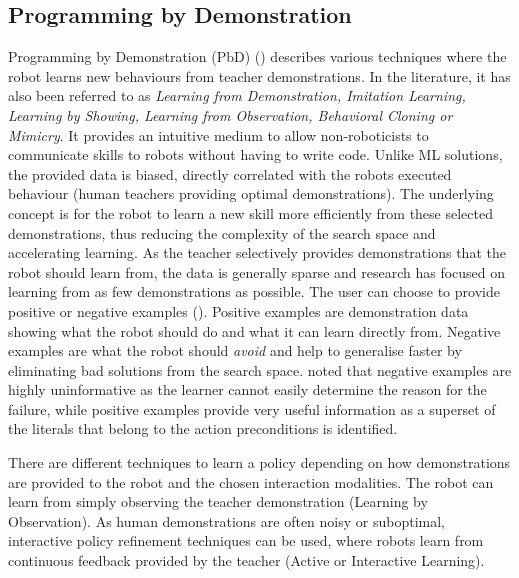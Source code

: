 \subsection{Programming by Demonstration}\label{sssec:PbD}
Programming by Demonstration (PbD) (\cite{billard2016learning,argall2009survey}) describes various techniques where the robot learns new behaviours from teacher demonstrations.
In the literature, it has also been referred to as \textit{Learning from Demonstration, Imitation Learning, Learning by Showing, Learning from Observation, Behavioral Cloning or Mimicry}.
It provides an intuitive medium to allow non-roboticists to communicate skills to robots without having to write code.
Unlike ML solutions, the provided data is biased, \ie directly correlated with the robots executed behaviour (\eg human teachers providing optimal demonstrations).
The underlying concept is for the robot to learn a new skill more efficiently from these selected demonstrations, thus reducing the complexity of the search space and accelerating learning.
As the teacher selectively provides demonstrations that the robot should learn from, the data is generally sparse and research has focused on learning from as few demonstrations as possible.
The user can choose to provide positive or negative examples (\cite{grollman2012robot}). %
Positive examples are demonstration data showing what the robot should do and what it can learn directly from. %
Negative examples are what the robot should \textit{avoid} and help to generalise faster by eliminating bad solutions from the search space. %
\cite{walsh2010efficient} noted that negative examples are highly uninformative as the learner cannot easily determine the reason for the failure, while positive examples provide very useful information as a superset of the literals that belong to the action preconditions is identified.

There are different techniques to learn a policy depending on how demonstrations are provided to the robot and the chosen interaction modalities.
The robot can learn from simply observing the teacher demonstration (Learning by Observation).%
As human demonstrations are often noisy or suboptimal, interactive policy refinement techniques can be used, where robots learn from continuous feedback provided by the teacher (Active or Interactive Learning).

